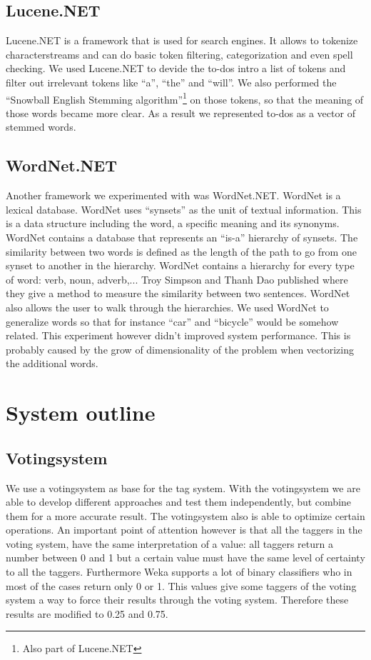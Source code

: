 \documentclass[a4paper,titlepage]{article}
\begin{document}
\subsection{Lucene.NET}
Lucene.NET is a framework that is used for search engines. It allows to tokenize characterstreams and can do basic token filtering, categorization and even spell checking. We used Lucene.NET to devide the to-dos intro a list of tokens and filter out irrelevant tokens like ``a'', ``the'' and ``will''. We also performed the ``Snowball English Stemming algorithm''\footnote{Also part of Lucene.NET} on those tokens, so that the meaning of those words became more clear. As a result we represented to-dos as a vector of stemmed words.
\subsection{WordNet.NET}
Another framework we experimented with was WordNet.NET. WordNet is a lexical database. WordNet uses ``synsets'' as the unit of textual information. This is a data structure including the word, a specific meaning and its synonyms. WordNet contains a database that represents an ``is-a'' hierarchy of synsets. The similarity between two words is defined as the length of the path to go from one synset to another in the hierarchy. WordNet contains a hierarchy for every type of word: verb, noun, adverb,... Troy Simpson and Thanh Dao published \cite{codeproject1} where they give a method to measure the similarity between two sentences. WordNet also allows the user to walk through the hierarchies. We used WordNet to generalize words so that for instance ``car'' and ``bicycle'' would be somehow related. This experiment however didn't improved system performance. This is probably caused by the grow of dimensionality of the problem when vectorizing the additional words.
\section{System outline}
\subsection{Votingsystem}
We use a votingsystem as base for the tag system. With the votingsystem we are able to develop different approaches and test them independently, but combine them for a more accurate result. The votingsystem also is able to optimize certain operations. An important point of attention however is that all the taggers in the voting system, have the same interpretation of a value: all taggers return a number between 0 and 1
but a certain value must have the same level of certainty to all the taggers. Furthermore Weka supports a lot of binary classifiers who in most of the cases return only 0 or 1. This values give some taggers of the voting system a way to force their results through the voting system. Therefore these results are modified to 0.25 and 0.75.
\end{document}
